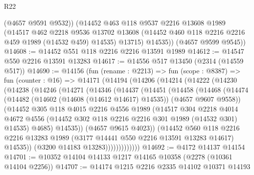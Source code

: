 \begin{lexlean}{R22}
\begin{coremodule}
          (@4657 @9591 @9532))
        (@14452
          @463
          @118
          @9537
          @2216
          @13608
          @1989
          (@14517
            @462
            @2218
            @9536
            @13702
            @13608
            (@14452 @460 @118 @2216 @2216 @459 @1989 (@14532 @459) @14535)
            @13715)
          @14535))
      (@4657 @9599 @9545))
@14608 := @14452 @551 @118 @2216 @2216 @13591 @1989
@14612 := @14547 @550 @2216 @13591 @13283
@14617 := @14556 @517 @13450 (@2314 (@14559 @517))
@14690 := @14156
    (fun (rename : @2213) =>
    fun (scope : @8387) =>
    fun (counter : @16) =>
    @14171
      (@14194
        (@14206
          (@14214
            (@14222
              (@14230
                (@14238
                  (@14246
                    (@14271
                      (@14346
                        (@14437
                          (@14451
                            (@14458
                              (@14468
                                (@14474
                                  (@14482
                                    (@14602 (@14608 (@14612 @14617) @14535))
                                    (@4657 @9607 @9558))
                                  (@14452
                                    @305
                                    @118
                                    @4015
                                    @2216
                                    @4556
                                    @1989
                                    (@14517
                                      @304
                                      @2218
                                      @4014
                                      @4672
                                      @4556
                                      (@14452 @302 @118 @2216 @2216 @301 @1989 (@14532 @301) @14535)
                                      @4685)
                                    @14535))
                                (@4657 @9615 @4023))
                              (@14452
                                @560
                                @118
                                @2216
                                @2216
                                @13283
                                @1989
                                (@3177 @14441 @550 @2216 @13591 @13283 @14617)
                                @14535))
                            (@3200 @14183 @13283)))))))))))))
@14692 := @4172 @14137 @14154
@14701 := @10352 @14104 @14133 @1217 @14165 @10358 (@2278 (@10361 @14104 @2256))
@14707 := @14174 @1215 @2216 @2335 @14102 @10371 @14193

\end{coremodule}
\end{lexlean}
